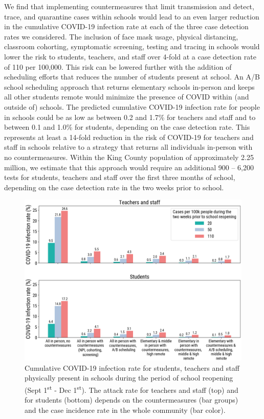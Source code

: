 \documentclass[9pt,twocolumn,twoside,lineno]{pnas-new}
\begin{document}
We find that implementing countermeasures that limit transmission and detect, trace, and quarantine cases within schools would lead to an even larger reduction in the cumulative COVID-19 infection rate at each of the three case detection rates we considered. The inclusion of face mask usage, physical distancing, classroom cohorting, symptomatic screening, testing and tracing in schools would lower the risk to students, teachers, and staff over 4-fold at a case detection rate of 110 per 100,000. This risk can be lowered further with the addition of scheduling efforts that reduces the number of students present at school. An A/B school scheduling approach that returns elementary schools in-person and keeps all other students remote would minimize the presence of COVID within (and outside of) schools. The predicted cumulative COVID-19 infection rate for people in schools could be as low as between 0.2 and 1.7\% for teachers and staff and to between 0.1 and 1.0\% for students, depending on the case detection rate. This represents at least a 14-fold reduction in the risk of COVID-19 for teachers and staff in schools relative to a strategy that returns all individuals in-person with no countermeasures. Within the King County population of approximately 2.25 million, we estimate that this approach would require an additional 900 -- 6,200 tests for students, teachers and staff over the first three months of school, depending on the case detection rate in the two weeks prior to school.

\begin{figure}[t] %
    \centering
    \includegraphics[width=\linewidth]{attack_rate_2020-08-06_trim_notitle.png}
    \caption{Cumulative COVID-19 infection rate for students, teachers and staff physically present in schools during the period of school reopening (Sept 1\textsuperscript{st} - Dec 1\textsuperscript{st}). The attack rate for teachers and staff (top) and for students (bottom) depends on the countermeasures (bar groups) and the case incidence rate in the whole community (bar color).}
    \label{fig:attack_rate}
\end{figure}
\end{document}

